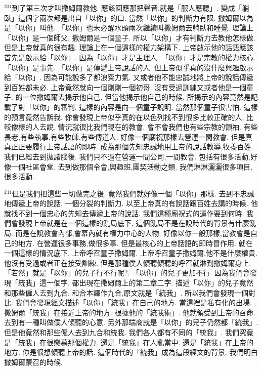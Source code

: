 \documentclass{book}
\begin{document}
$^{201}$到了第三次才叫撒姆爾教他.
應該回應那把聲音,就是「服人應聽」.
變成「躺臥」這個字兩次都是出自「以你」的口.
當然「以你」的判斷力有限.
撒姆爾以為是「以你」叫他.
「以你」也未必醒水頭兩次繼續叫撒姆爾去躺臥和睡覺.
理論上「以你」是一個師父.
撒姆爾是一個童子.
所以「以你」才有判斷力去教他怎樣做.
但是上帝就真的很有趣.
理論上在一個這樣的權力架構下.
上帝啟示他的話語應該首先是啟示給「以你」.
因為「以你」才是主理人.
「以你」才是宗教的權力核心.
「以你」是事先.
「以你」是傳遞上帝說話的人.
但上帝似乎真的沒什麼興趣啟示給「以你」.
因為可能說多了都浪費力氣.
又或者他不能忠誠地將上帝的說話傳遞到百姓都未必.
上帝竟然就向一個剛剛一個初哥.
沒有受過訓練又或者他是一個童子.
的一位撒姆爾去揭示他自己.
但當他揭示他自己的時候.
所揭示的內容竟然是記載了對「以你」的審判.
這樣的內容是向一個童子說明.
當然那個童子很害怕.
這樣的預言竟然告訴我.
你會發現上帝似乎真的在以色列找不到很多比較正確的人.
比較像樣的人去說.
情況就很比我們現在的教會.
會不會我們也有些宗教的領袖.
有些長老,有些執事,有些牧師,有些傳道人.
好像一個廟祝那樣去營運一間教會.
但是真真正正要履行上帝話語的即時.
成為那個先知忠誠地用上帝的說話教導,牧養百姓.
我們已經去到拋諸腦後.
我們只不過在營運一間公司,一間教會.
包括有很多活動,好像一個社區會堂.
去到做那個令會,興趣班,團契活動之類.
我們淋淋灑灑很多項目,很多活動.

$^{241}$但是我們把這些一切做完之後.
竟然我們就好像一個「以你」那樣.
去到不忠誠地傳遞上帝的說話.
一個分裂的判斷力.
以至上帝真的有說話跟百姓去講的時候.
他就找不到一個忠心的先知去傳遞上帝的說話.
我們這種廟祝式的運作要到何時.
我們會發現上帝就是在一個這樣的亂局底下.
這個亂局不是在說時代的背景有什麼亂局.
而是在說教會內部,會幕內就有權力中心的人物.
好像以你一般那樣,當教會是自己的地方.
在營運很多事務,做很多事.
但是最核心的上帝話語的即時冒作用.
就在一個這樣的情況底下.
上帝呼召童子撒姆爾.
上帝呼召童子撒姆爾,他不是什麼權貴.
他沒有受過或者正在接受訓練.
但是那種僕人傾聽傾聽的呼召就淋到撒姆爾身上.
「若然」就是「以你」的兒子行不行呢?.
「以你」的兒子更加不行.
因為我們會發現「統我」這一個字.
都出現在撒姆爾上的第二章二字.
描述「以你」的兒子竟然和那些僱人去到九合.
和合本譯作九合,原文就是「統我」.
所以我們會發現一個對比.
我們會發現經文描述「以你」「統我」在自己的地方.
當這裡是私有化的出場.
撒姆爾「統我」在接近上帝的地方.
根據他的「統我術」.
他就領受到上帝的召命.
去到有一種叫做僕人傾聽的心意.
另外那端商就是「以你」的兒子仍然都「統我」.
但是他竟然和那些僱人去到九合和統我.
我們各人都有不同的「統我」.
我們究竟是「統我」在很戀慕那個權力.
還是「統我」在人亂當中.
還是「統我」在上帝的地方.
你是很想傾聽上帝的話.
這個時代的「統我」成為這段經文的背景.
我們明白撒姆爾蒙召的時候.
\end{document}
